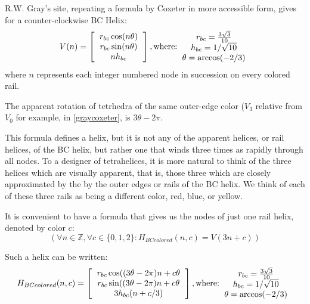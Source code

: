 \documentclass[11pt]{article}
\begin{document}
R.W. Gray's site\cite{graytetrahelix}, repeating a formula by Coxeter\cite{coxeter1985simplicial} in more accessible form, gives for a counter-clockwise BC Helix:
\begin{equation}
  \label{graycoxeter}
V(n) =
\left [
  \begin{tabular}{c}
   $ r_{bc} \cos(n \theta) $\\
   $ r_{bc} \sin(n \theta) $\\
   $ n h_{bc}  $
  \end{tabular}
  \right ],
\text{where:}
  \begin{tabular}{c}
 $ r_{bc} = \frac{3\sqrt{3}}{10} $\\
 $ h_{bc} = 1/\sqrt{10} $ \\
 $ \theta = \arccos(-2/3) $ \\
  \end{tabular}      
\end{equation}
where $n$ represents each integer numbered node in succession on every colored rail.

The apparent rotation of tetrhedra of the same outer-edge color ($V_3$ relative from $V_0$ for example,
in \eqref{graycoxeter}, is $3 \theta - 2\pi$.

This formula defines a helix, but it is not any of the apparent helices, or rail helices, of the
BC helix, but rather one that winds three times as rapidly through all
nodes. To a designer of tetrahelices, it is more natural to think of
the three helices which are visually apparent, that is, those three
which are closely approximated by the by the outer edges or rails of
the BC helix. We think of each of these three rails as being a different color, red, blue, or yellow.

It is convenient to have a formula that gives us the nodes of just
one rail helix, denoted by color $c$:
\[
(\forall n \in \mathbb{Z}, \forall c \in \{0,1,2\} : H_{BCcolored}(n,c) = V(3n +c))
\]

Such a helix can be written:
\begin{equation}
  \label{eq:colord}
H_{BCcolored}(n,c) =
\left [
  \begin{tabular}{c}
   $ r_{bc}  \cos((3 \theta - 2 \pi)n + c  \theta $\\
   $ r_{bc} \sin((3 \theta - 2 \pi)n + c  \theta $\\
   $ 3 h_{bc} (n + c/3)  $
  \end{tabular}
  \right ],
\text{where:}
  \begin{tabular}{c}
 $ r_{bc} = \frac{3\sqrt{3}}{10} $\\
 $ h_{bc} = 1/\sqrt{10} $ \\
 $ \theta = \arccos(-2/3) $ \\
  \end{tabular}      
\end{equation}
\end{document}
